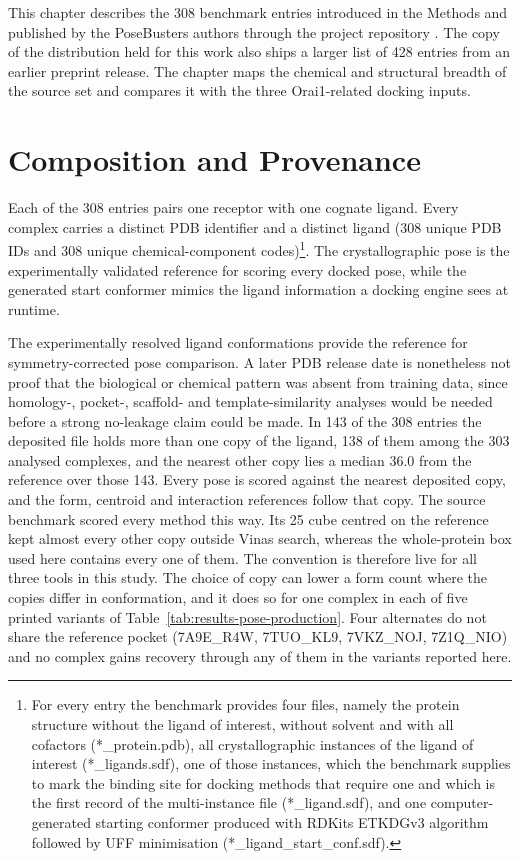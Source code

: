 This chapter describes the 308 benchmark entries introduced in the Methods and published by the PoseBusters authors through the project repository \cite{ref035}. The copy of the distribution held for this work also ships a larger list of 428 entries from an earlier preprint release. The chapter maps the chemical and structural breadth of the source set and compares it with the three Orai1-related docking inputs.

\hypertarget{composition-and-provenance}{%
\section{Composition and Provenance}\label{composition-and-provenance}}

Each of the 308 entries pairs one receptor with one cognate ligand. Every complex carries a distinct PDB identifier and a distinct ligand (308 unique PDB IDs and 308 unique chemical-component codes)\footnote{For every entry the benchmark provides four files, namely the protein structure without the ligand of interest, without solvent and with all cofactors (*\_protein.pdb), all crystallographic instances of the ligand of interest (*\_ligands.sdf), one of those instances, which the benchmark supplies to mark the binding site for docking methods that require one and which is the first record of the multi-instance file (*\_ligand.sdf), and one computer-generated starting conformer produced with RDKit\textquotesingle{}s ETKDGv3 algorithm followed by UFF minimisation (*\_ligand\_start\_conf.sdf).}. The crystallographic pose is the experimentally validated reference for scoring every docked pose, while the generated start conformer mimics the ligand information a docking engine sees at runtime.

The experimentally resolved ligand conformations provide the reference for symmetry-corrected pose comparison. A later PDB release date is nonetheless not proof that the biological or chemical pattern was absent from training data, since homology-, pocket-, scaffold- and template-similarity analyses would be needed before a strong no-leakage claim could be made. In 143 of the 308 entries the deposited file holds more than one copy of the ligand, 138 of them among the 303 analysed complexes, and the nearest other copy lies a median 36.0\angstrom{} from the reference over those 143. Every pose is scored against the nearest deposited copy, and the form, centroid and interaction references follow that copy. The source benchmark scored every method this way. Its 25\angstrom{} cube centred on the reference kept almost every other copy outside Vina\textquotesingle s search, whereas the whole-protein box used here contains every one of them. The convention is therefore live for all three tools in this study. The choice of copy can lower a form count where the copies differ in conformation, and it does so for one complex in each of five printed variants of Table~\ref{tab:results-pose-production}. Four alternates do not share the reference pocket (7A9E\_R4W, 7TUO\_KL9, 7VKZ\_NOJ, 7Z1Q\_NIO) and no complex gains recovery through any of them in the variants reported here.

